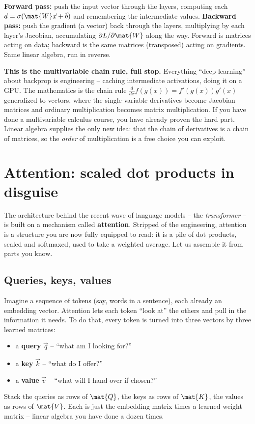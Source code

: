 \begin{focusbox}
\textbf{Forward pass:} push the input vector through the layers, computing each
$\vec{a}=\sigma(\mat{W}\vec{x}+\vec{b})$ and remembering the intermediate values.
\textbf{Backward pass:} push the gradient (a vector) back through the layers, multiplying
by each layer's Jacobian, accumulating $\partial L/\partial \mat{W}$ along the way.
Forward is matrices acting on data; backward is the same matrices (transposed) acting on
gradients. Same linear algebra, run in reverse.
\end{focusbox}

\begin{connectionbox}
\textbf{This is the multivariable chain rule, full stop.} Everything ``deep learning''
about backprop is engineering -- caching intermediate activations, doing it on a GPU. The
mathematics is the chain rule $\frac{d}{dx}f(g(x))=f'(g(x))g'(x)$ generalized to vectors,
where the single-variable derivatives become Jacobian matrices and ordinary
multiplication becomes matrix multiplication. If you have done a multivariable calculus
course, you have already proven the hard part. Linear algebra supplies the only new idea:
that the chain of derivatives is a chain of matrices, so the \emph{order} of multiplication
is a free choice you can exploit.
\end{connectionbox}

\section{Attention: scaled dot products in disguise}
\label{ch34:attention}

The architecture behind the recent wave of language models -- the \emph{transformer} --
is built on a mechanism called \textbf{attention}. Stripped of the engineering, attention
is a structure you are now fully equipped to read: it is a pile of dot products, scaled and
softmaxed, used to take a weighted average. Let us assemble it from parts you know.

\subsection{Queries, keys, values}

Imagine a sequence of tokens (say, words in a sentence), each already an embedding vector.
Attention lets each token ``look at'' the others and pull in the information it needs. To
do that, every token is turned into three vectors by three learned matrices:
\begin{itemize}
  \item a \textbf{query} $\vec{q}$ -- ``what am I looking for?''
  \item a \textbf{key} $\vec{k}$ -- ``what do I offer?''
  \item a \textbf{value} $\vec{v}$ -- ``what will I hand over if chosen?''
\end{itemize}
Stack the queries as rows of $\mat{Q}$, the keys as rows of $\mat{K}$, the values as rows
of $\mat{V}$. Each is just the embedding matrix times a learned weight matrix -- linear
algebra you have done a dozen times.

